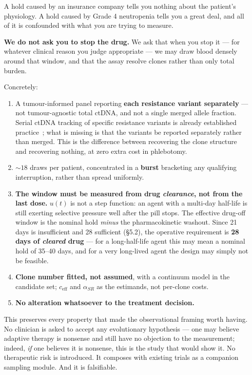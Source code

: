 \documentclass[11pt,a4paper]{article}
\newcommand{\ceff}{c_{\mathrm{eff}}}
\newcommand{\aSR}{\alpha_{SR}}
\begin{document}
A hold caused by an insurance company tells you nothing about the patient's
physiology. A hold caused by Grade 4 neutropenia tells you a great deal, and all of it
is confounded with what you are trying to measure.

\begin{tcolorbox}[keybox]
\textbf{We do not ask you to stop the drug.} We ask that when you stop it --- for
whatever clinical reason you judge appropriate --- we may draw blood densely around
that window, and that the assay resolve clones rather than only total burden.
\end{tcolorbox}

Concretely:

\begin{enumerate}[label=(\alph*),leftmargin=1.8em,itemsep=0.3em]
\item A tumour-informed panel reporting \textbf{each resistance variant separately}
--- not tumour-agnostic total ctDNA, and not a single merged allele fraction.
Serial ctDNA tracking of specific resistance variants is already established
practice~\citep{dawson2013analysis,diaz2012molecular,misale2012emergence}; what is
missing is that the variants be reported separately rather than merged. This
is the difference between recovering the clone structure and recovering nothing, at
zero extra cost in phlebotomy.
\item ${\sim}18$ draws per patient, concentrated in a \textbf{burst} bracketing any
qualifying interruption, rather than spread uniformly.
\item \textbf{The window must be measured from drug \emph{clearance}, not from the
last dose.} $u(t)$ is not a step function: an agent with a multi-day half-life is
still exerting selective pressure well after the pill stops. The effective drug-off
window is the nominal hold \emph{minus} the pharmacokinetic washout. Since 21 days is
insufficient and 28 sufficient (\S5.2), the operative requirement is
\textbf{28 days of \emph{cleared} drug} --- for a long-half-life agent this may mean a
nominal hold of 35--40 days, and for a very long-lived agent the design may simply not
be feasible.
\item \textbf{Clone number fitted, not assumed}, with a continuum model in the
candidate set; $\ceff$ and $\aSR$ as the estimands, not per-clone costs.
\item \textbf{No alteration whatsoever to the treatment decision.}
\end{enumerate}

This preserves every property that made the observational framing worth having. No
clinician is asked to accept any evolutionary hypothesis --- one may believe adaptive
therapy is nonsense and still have no objection to the measurement; indeed,
\emph{if} one believes it is nonsense, this is the study that would show it. No
therapeutic risk is introduced. It composes with existing trials as a companion
sampling module. And it is falsifiable.
\end{document}
